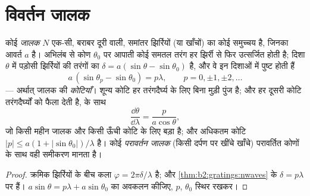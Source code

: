 \section{विवर्तन जालक}

\begin{proposition}[जालक का समीकरण]\label{prop:b2:gratings:equation}
कोई \emph{जालक} $N$ एक-सी, बराबर दूरी वाली, समांतर झिर्रियों
(या खाँचों) का कोई समुच्चय है, जिनका आवर्त $a$ है। अभिलंब से कोण $\theta_0$ पर आपाती कोई समतल तरंग
हर झिर्री से फिर उत्सर्जित होती है; दिशा $\theta$ में
पड़ोसी झिर्रियों की तरंगों का  $\delta = a(\sin\theta
- \sin\theta_0)$ है, और वे इन दिशाओं में पुष्ट होती हैं
\[
a\,(\sin\theta_p - \sin\theta_0) = p\lambda , \qquad p = 0, \pm1, \pm2, \dots
\]
--- अर्थात् जालक की \emph{कोटियाँ}। शून्य कोटि हर तरंगदैर्घ्य के लिए बिना
मुड़ी पुंज है; और हर दूसरी कोटि तरंगदैर्घ्यों को फैला देती है,
\emph{} के साथ
\[
\frac{\dd\theta}{\dd\lambda} = \frac{p}{a\cos\theta} ,
\]
जो किसी महीन जालक और किसी ऊँची कोटि के लिए बड़ा है; और अधिकतम कोटि
$|p| \le a(1 + |\sin\theta_0|)/\lambda$ है। कोई \emph{परावर्तन जालक} (किसी दर्पण पर खींचे
खाँचे) परावर्तित कोणों के साथ वही समीकरण मानता है।
\end{proposition}

\begin{proof}
क्रमिक झिर्रियों के बीच कला $\varphi = 2\pi\delta/\lambda$ है; और
\cref{thm:b2:gratings:nwaves} के  $\delta = p\lambda$ पर हैं।
$a\sin\theta = p\lambda + a\sin\theta_0$ का अवकलन कीजिए, $p$, $\theta_0$ स्थिर रखकर।
\end{proof}

